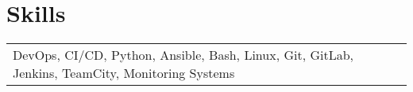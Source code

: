 \documentclass[a4paper,12pt]{article}
\begin{document}
\section{Skills}
\begin{tabularx}{\linewidth}{@{}l X@{}}
\normalsize{DevOps, CI/CD, Python, Ansible, Bash, Linux, Git, GitLab, Jenkins, TeamCity, Monitoring Systems}\\
\end{tabularx}

\vfill
{}
\end{document}
